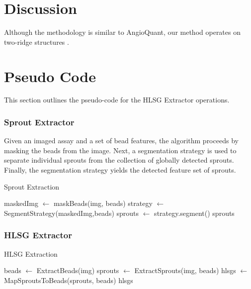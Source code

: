 \documentclass{sig-alternate}
\begin{document}
\section{Discussion} %
\label{sec:Discussion}
	Although the methodology is similar to AngioQuant, our method operates on
	two-ridge structures \cite{niemisto05}.




\appendix
\section{Pseudo Code} %
\label{sec:Pseudo Code}
	This section outlines the pseudo-code for the HLSG Extractor
	operations. 

	\subsubsection{Sprout Extractor} %
	\label{ssub:Sprout Extractor}
		Given an imaged assay and a set of bead features, the algorithm
		proceeds by masking the beads from the image. Next, a segmentation
		strategy is used to separate individual sprouts from the
		collection of globally detected sprouts. Finally, the segmentation
		strategy yields the detected feature set of sprouts.
		\begin{algorithm}[ht!] \caption{Sprout Extraction}
			\begin{algorithmic}
					\State maskedImg $\gets$ maskBeads(img, beads)
					\State strategy $\gets$ SegmentStrategy(maskedImg,beads)
					\State sprouts $\gets$ strategy.segment()
					\State \Return sprouts
				\EndProcedure
			\end{algorithmic}
		\end{algorithm}

	\subsubsection{HLSG Extractor} %
	\label{ssub:HLSG Extractor}
		\begin{algorithm}[ht!]
			\caption{HLSG Extraction}
			\begin{algorithmic}
				\Procedure{ExtractHLSGs}{img}
					\State beads $\gets$ ExtractBeads(img)
					\State sprouts $\gets$ ExtractSprouts(img, beads)
					\State hlsgs $\gets$ MapSproutsToBeads(sprouts, beads)
					\State \Return hlsgs
				\EndProcedure
			\end{algorithmic}
		\end{algorithm}
\end{document}
